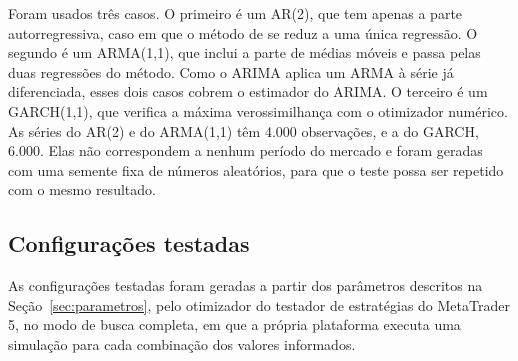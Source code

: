 Foram usados três casos. O primeiro é um AR(2), que tem apenas a parte
autorregressiva, caso em que o método de  se reduz a uma
única regressão. O segundo é um ARMA(1,1), que inclui a parte de médias móveis e
passa pelas duas regressões do método. Como o ARIMA aplica um ARMA à série já
diferenciada, esses dois casos cobrem o estimador do ARIMA. O terceiro é um
GARCH(1,1), que verifica a máxima verossimilhança com o otimizador numérico. As
séries do AR(2) e do ARMA(1,1) têm 4.000 observações, e a do GARCH, 6.000. Elas
não correspondem a nenhum período do mercado e foram geradas com uma semente fixa
de números aleatórios, para que o teste possa ser repetido com o mesmo resultado.

\subsection{Configurações testadas}

As configurações testadas foram geradas a partir dos parâmetros descritos na
Seção~\ref{sec:parametros}, pelo otimizador do testador de estratégias do
MetaTrader 5, no modo de busca completa, em que a própria plataforma executa
uma simulação para cada combinação dos valores informados.

